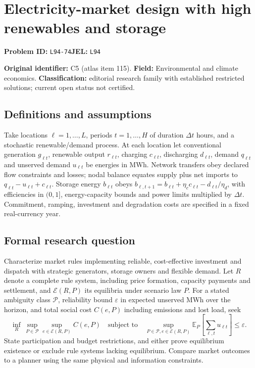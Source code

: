 \documentclass[11pt,a4paper]{article}
\begin{document}
\section*{Electricity-market design with high renewables and storage}
\textbf{Problem ID:} \texttt{L94-74}\quad \textbf{JEL:} \texttt{L94}\par
\label{problem:OP-0115}
\label{audited:ECON-040}


\label{atlas:prob:C5}

\noindent\textbf{Original identifier:} C5 (atlas item 115). \textbf{Field:} Environmental and climate economics. \textbf{Classification:} editorial research family with established restricted solutions; current open status not certified.

\subsection*{Definitions and assumptions}

Take locations $\ell=1,\ldots,L$, periods $t=1,\ldots,H$ of duration $\Delta t$ hours, and a stochastic renewable/demand process. At each location let conventional generation $g_{\ell t}$, renewable output $r_{\ell t}$, charging $c_{\ell t}$, discharging $d_{\ell t}$, demand $q_{\ell t}$ and unserved demand $u_{\ell t}$ be energies in MWh. Network transfers obey declared flow constraints and losses; nodal balance equates supply plus net imports to $q_{\ell t}-u_{\ell t}+c_{\ell t}$. Storage energy $b_{\ell t}$ obeys $b_{\ell,t+1}=b_{\ell t}+\eta_c c_{\ell t}-d_{\ell t}/\eta_d$, with efficiencies in $(0,1]$, energy-capacity bounds and power limits multiplied by $\Delta t$. Commitment, ramping, investment and degradation costs are specified in a fixed real-currency year.

\subsection*{Formal research question}

Characterize market rules implementing reliable, cost-effective investment and dispatch with strategic generators, storage owners and flexible demand. Let $R$ denote a complete rule system, including price formation, capacity payments and settlement, and $\mathcal E(R,P)$ its equilibria under scenario law $P$. For a stated ambiguity class $\mathcal P$, reliability bound $\varepsilon$ in expected unserved MWh over the horizon, and total social cost $C(e,P)$ including emissions and lost load, seek
\[
\inf_R\ \sup_{P\in\mathcal P}\sup_{e\in\mathcal E(R,P)} C(e,P)
\quad\text{subject to}\quad
\sup_{P\in\mathcal P,e\in\mathcal E(R,P)}
\mathbb E_P\!\left[\sum_{\ell,t}u_{\ell t}\right]\le\varepsilon .
\]
State participation and budget restrictions, and either prove equilibrium existence or exclude rule systems lacking equilibrium. Compare market outcomes to a planner using the same physical and information constraints.
\end{document}
